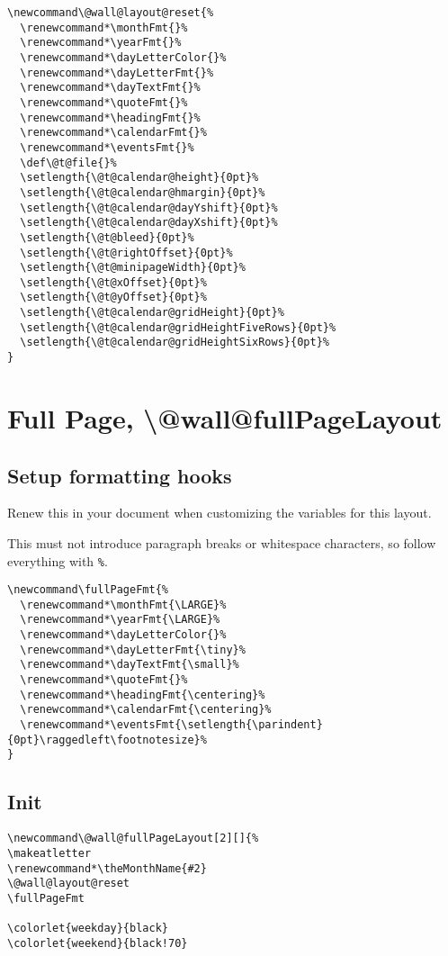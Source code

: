 \documentclass[11pt,oneside]{memoir-article}
\begin{document}
\begin{verbatim}
\newcommand\@wall@layout@reset{%
  \renewcommand*\monthFmt{}%
  \renewcommand*\yearFmt{}%
  \renewcommand*\dayLetterColor{}%
  \renewcommand*\dayLetterFmt{}%
  \renewcommand*\dayTextFmt{}%
  \renewcommand*\quoteFmt{}%
  \renewcommand*\headingFmt{}%
  \renewcommand*\calendarFmt{}%
  \renewcommand*\eventsFmt{}%
  \def\@t@file{}%
  \setlength{\@t@calendar@height}{0pt}%
  \setlength{\@t@calendar@hmargin}{0pt}%
  \setlength{\@t@calendar@dayYshift}{0pt}%
  \setlength{\@t@calendar@dayXshift}{0pt}%
  \setlength{\@t@bleed}{0pt}%
  \setlength{\@t@rightOffset}{0pt}%
  \setlength{\@t@minipageWidth}{0pt}%
  \setlength{\@t@xOffset}{0pt}%
  \setlength{\@t@yOffset}{0pt}%
  \setlength{\@t@calendar@gridHeight}{0pt}%
  \setlength{\@t@calendar@gridHeightFiveRows}{0pt}%
  \setlength{\@t@calendar@gridHeightSixRows}{0pt}%
}
\end{verbatim}

\section{Full Page, \textbackslash @wall@fullPageLayout}
\label{sec:orgc8c056f}
\subsection{Setup formatting hooks}
\label{sec:org00eec7b}

Renew this in your document when customizing the variables for this layout.

This must not introduce paragraph breaks or whitespace characters, so follow
everything with \texttt{\%}.

\begin{verbatim}
\newcommand\fullPageFmt{%
  \renewcommand*\monthFmt{\LARGE}%
  \renewcommand*\yearFmt{\LARGE}%
  \renewcommand*\dayLetterColor{}%
  \renewcommand*\dayLetterFmt{\tiny}%
  \renewcommand*\dayTextFmt{\small}%
  \renewcommand*\quoteFmt{}%
  \renewcommand*\headingFmt{\centering}%
  \renewcommand*\calendarFmt{\centering}%
  \renewcommand*\eventsFmt{\setlength{\parindent}{0pt}\raggedleft\footnotesize}%
}
\end{verbatim}

\subsection{Init}
\label{sec:org8f3ec94}

\begin{verbatim}
\newcommand\@wall@fullPageLayout[2][]{%
\makeatletter
\renewcommand*\theMonthName{#2}
\@wall@layout@reset
\fullPageFmt

\colorlet{weekday}{black}
\colorlet{weekend}{black!70}
\end{verbatim}
\end{document}
